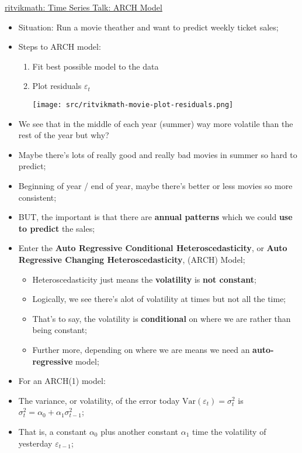 \documentclass[12pt, titlepage, french]{report}
\begin{document}
\begin{YTB_SUMM}{\href{https://www.youtube.com/watch?v=Li95a2biFCU&list=PLvcbYUQ5t0UHOLnBzl46_Q6QKtFgfMGc3&index=8}{ritvikmath: Time Series Talk: ARCH Model}}
\begin{itemize}
	\item	Situation: Run a movie theather and want to predict weekly ticket sales;
	\item	Steps to ARCH model:
		\begin{enumerate}
		\item	Fit best possible model to the data
		\item	Plot residuals $\varepsilon_{t}$
		
		\texttt{[image: src/ritvikmath-movie-plot-residuals.png]}
		\end{enumerate}
	\item	We see that in the middle of each year (summer) way more volatile than the rest of the year but why?
	\item[]	Maybe there's lots of really good and really bad movies in summer so hard to predict;
	\item[]	Beginning of year / end of year, maybe there's better or less movies so more consistent;
	\item	BUT, the important is that there are \textbf{annual patterns} which we could \textbf{use to predict} the sales;
	\item	Enter the \textbf{Auto Regressive Conditional Heteroscedasticity}, or \textbf{Auto Regressive Changing Heteroscedasticity}, (ARCH) Model;
		\begin{itemize}
		\item	Heteroscedasticity just means the \textbf{volatility} is \textbf{not constant};
		\item[]	Logically, we see there's alot of volatility at times but not all the time;
		\item	That's to say, the volatility is \textbf{conditional} on where we are rather than being constant;
		\item	Further more, depending on where we are means we need an \textbf{auto-regressive} model;
		\end{itemize}
	\item	For an ARCH(1) model:
	\item	The variance, or volatility, of the error today $\text{Var}(\varepsilon_{t}) = \sigma^{2}_{t}$ is $\sigma^{2}_{t} = \alpha_{0} + \alpha_{1} \sigma^{2}_{t - 1}$;
	\item[]	That is, a constant $\alpha_{0}$ plus another constant $\alpha_{1}$ time the volatility of yesterday $\varepsilon_{t - 1}$;

\end{itemize}
\end{YTB_SUMM}
\end{document}
